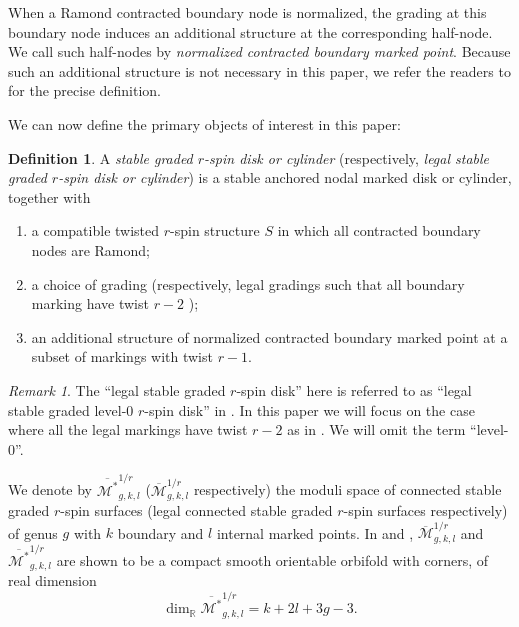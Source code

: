 \documentclass[11pt]{amsart}
\theoremstyle{definition}
\newtheorem{definition}[dummy]{Definition}
\theoremstyle{remark}
\newtheorem{rmk}[dummy]{Remark}
\newcommand{\<}{\left<}
\renewcommand{\>}{\right>}
\numberwithin{equation}{section}
\def\Mbar{{\overline{\mathcal M}}}
\def\Mbarstar{{\overline{\mathcal M^*}}}
\begin{document}
When a Ramond contracted boundary node is normalized, the grading at this boundary node induces an additional structure at the corresponding half-node. We call such half-nodes by \textit{normalized contracted boundary marked point}. Because such an additional structure is not necessary in this paper, we refer the readers to \cite[Definition 2.5]{TZ1} for the precise definition. 



We can now define the primary objects of interest in this paper:

\begin{definition}
\label{def graded rspin disk}
A \textit{stable graded $r$-spin disk or cylinder} (respectively, \textit{legal stable graded $r$-spin disk or cylinder}) is a stable anchored nodal marked disk or cylinder, together with
\begin{enumerate}
\item a compatible twisted $r$-spin structure $S$ in which all contracted boundary nodes are Ramond;
\item a choice of grading (respectively, legal gradings such that all boundary marking have twist $r-2$ );

\item  an additional structure of normalized contracted boundary marked point at a subset of markings with twist $r-1$.

\end{enumerate}
\end{definition}

\begin{rmk}
   The ``legal stable graded $r$-spin disk'' here is referred to as ``legal stable graded level-$0$ $r$-spin disk'' in \cite{TZ1,TZ2}. In this paper we will focus on the case where all the legal markings have twist $r-2$ as in \cite{BCT2}. We will omit the term ``level-$0$''.
\end{rmk}





We denote by $\Mbarstar_{g,k,l}^{1/r}$ ($\Mbar_{g,k,l}^{1/r}$ respectively) the moduli space of connected stable graded $r$-spin surfaces (legal connected stable graded $r$-spin surfaces respectively) of genus $g$ with $k$ boundary and $l$ internal marked points. In \cite[Theorem 3.4]{BCT1} and \cite[Theorem 2.8]{TZ1}, $\Mbar_{g,k,l}^{1/r}$ and $\Mbarstar_{g,k,l}^{1/r}$ are shown to be a compact smooth orientable orbifold with corners, of real dimension 
\begin{equation}\label{eq dim of moduli}
\dim_{\mathbb R} \Mbarstar_{g,k,l}^{1/r}=k+2l+3g-3.
\end{equation}
\end{document}
